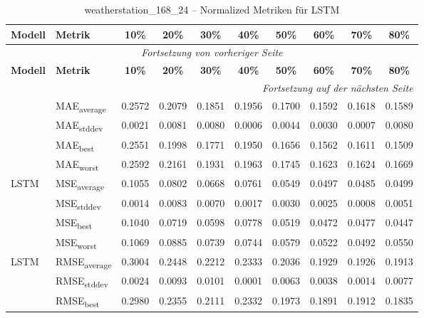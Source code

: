 {\small
\begin{longtable}{l l c c c c c c c c}
    \toprule
    \textbf{Modell} & \textbf{Metrik} & \textbf{10\%} & \textbf{20\%} & \textbf{30\%} & \textbf{40\%} & \textbf{50\%} & \textbf{60\%} & \textbf{70\%} & \textbf{80\%} \\
    \midrule
    \endfirsthead
    \multicolumn{10}{c}{\textit{Fortsetzung von vorheriger Seite}} \\
    \toprule
    \textbf{Modell} & \textbf{Metrik} & \textbf{10\%} & \textbf{20\%} & \textbf{30\%} & \textbf{40\%} & \textbf{50\%} & \textbf{60\%} & \textbf{70\%} & \textbf{80\%} \\
    \midrule
    \endhead
    \midrule
    \multicolumn{10}{r}{\textit{Fortsetzung auf der nächsten Seite}} \\
    \midrule
    \endfoot
    \bottomrule
    \caption{weatherstation_168_24 -- Normalized Metriken für LSTM}
    \label{tab:weatherstation_168_24_normalized_lstm}
    \endlastfoot
\multirow{4}{*}{LSTM} & MAE\textsubscript{average} & 0.2572 & 0.2079 & 0.1851 & 0.1956 & 0.1700 & 0.1592 & 0.1618 & 0.1589 \\
 & MAE\textsubscript{stddev} & 0.0021 & 0.0081 & 0.0080 & 0.0006 & 0.0044 & 0.0030 & 0.0007 & 0.0080 \\
 & MAE\textsubscript{best} & 0.2551 & 0.1998 & 0.1771 & 0.1950 & 0.1656 & 0.1562 & 0.1611 & 0.1509 \\
 & MAE\textsubscript{worst} & 0.2592 & 0.2161 & 0.1931 & 0.1963 & 0.1745 & 0.1623 & 0.1624 & 0.1669 \\
\cmidrule(lr){2-10}
\multirow{4}{*}{LSTM} & MSE\textsubscript{average} & 0.1055 & 0.0802 & 0.0668 & 0.0761 & 0.0549 & 0.0497 & 0.0485 & 0.0499 \\
 & MSE\textsubscript{stddev} & 0.0014 & 0.0083 & 0.0070 & 0.0017 & 0.0030 & 0.0025 & 0.0008 & 0.0051 \\
 & MSE\textsubscript{best} & 0.1040 & 0.0719 & 0.0598 & 0.0778 & 0.0519 & 0.0472 & 0.0477 & 0.0447 \\
 & MSE\textsubscript{worst} & 0.1069 & 0.0885 & 0.0739 & 0.0744 & 0.0579 & 0.0522 & 0.0492 & 0.0550 \\
\cmidrule(lr){2-10}
\multirow{4}{*}{LSTM} & RMSE\textsubscript{average} & 0.3004 & 0.2448 & 0.2212 & 0.2333 & 0.2036 & 0.1929 & 0.1926 & 0.1913 \\
 & RMSE\textsubscript{stddev} & 0.0024 & 0.0093 & 0.0101 & 0.0001 & 0.0063 & 0.0038 & 0.0014 & 0.0077 \\
 & RMSE\textsubscript{best} & 0.2980 & 0.2355 & 0.2111 & 0.2332 & 0.1973 & 0.1891 & 0.1912 & 0.1835 \\

\end{longtable}}
